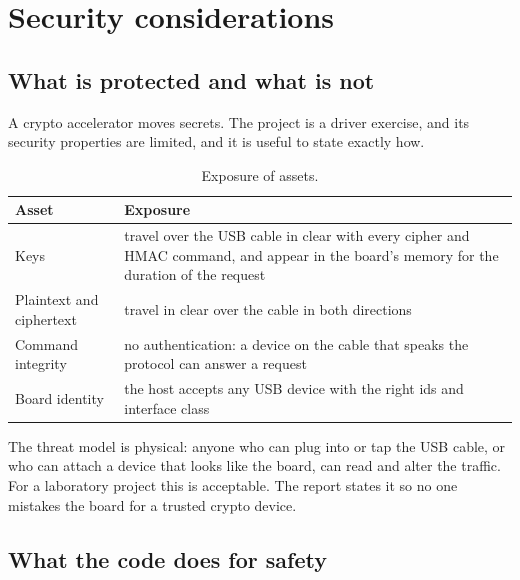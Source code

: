 \chapter{Security considerations}\label{ch:security}

\section{What is protected and what is not}

A crypto accelerator moves secrets. The project is a driver exercise, and its security properties are limited, and it is useful to state exactly how.

\begin{table}[ht]
\centering
\begin{tabularx}{\textwidth}{lX}
\toprule
Asset & Exposure \\
\midrule
Keys & travel over the USB cable in clear with every cipher and HMAC command, and appear in the board's memory for the duration of the request \\
Plaintext and ciphertext & travel in clear over the cable in both directions \\
Command integrity & no authentication: a device on the cable that speaks the protocol can answer a request \\
Board identity & the host accepts any USB device with the right ids and interface class \\
\bottomrule
\end{tabularx}
\caption{Exposure of assets.}
\end{table}

The threat model is physical: anyone who can plug into or tap the USB cable, or who can attach a device that looks like the board, can read and alter the traffic. For a laboratory project this is acceptable. The report states it so no one mistakes the board for a trusted crypto device.

\section{What the code does for safety}

